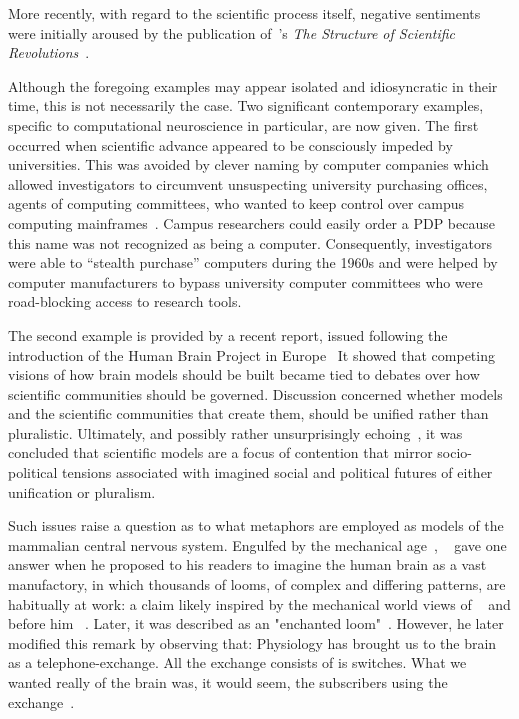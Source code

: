 \documentclass[11pt,3p,twocolumn]{JMN}
\begin{document}
More recently, with regard to the scientific process itself, negative sentiments were initially aroused by the publication of~\citeauthor{kuhn96}'s {\it The Structure of Scientific Revolutions}~\citep[first published 1962, see][]{bird22}.

Although the foregoing examples may appear isolated and idiosyncratic in their time, this is not necessarily the case. Two significant contemporary examples, specific to  computational neuroscience in particular, are now given. The first occurred when scientific advance appeared to be consciously impeded by universities. This was avoided by clever naming by computer companies which allowed investigators to circumvent unsuspecting university purchasing offices, agents of computing committees, who wanted to keep control over campus computing mainframes~\citep{Moore:2010vn}. Campus researchers could easily order a PDP because this name was not recognized as being a computer. Consequently, investigators were able to “stealth purchase” computers during the 1960s and were helped by computer manufacturers to bypass university computer committees who were road-blocking access to research tools.

The second example is provided by a recent report, issued following the introduction of the Human Brain Project in Europe~\citep{mahfoud21} It showed that competing visions of how brain models should be built became tied to debates over how scientific communities should be governed. Discussion concerned whether models and the scientific communities that create them, should be unified rather than pluralistic. Ultimately, and possibly rather unsurprisingly echoing~\citet{sperry80}, it was concluded that scientific models are a focus of contention that mirror socio-political tensions associated with imagined social and political futures of either unification or pluralism.

Such issues raise a question as to what metaphors are employed as models of the mammalian central nervous system. Engulfed by the mechanical age~\citep{carlyle52}, ~\citet{meyers87} gave one answer when he proposed to his readers to imagine the human brain as a vast manufactory, in which thousands of looms, of complex and differing patterns, are habitually at work: a claim likely inspired by the mechanical world views of ~\citet{descartes62} and before him ~\citet[][republished 2003]{fernel67}. Later, it was described as an "enchanted loom"~\citep{sherrington53}. However, he later modified this remark by observing that: Physiology has brought us to the brain as a telephone-exchange. All the exchange consists of is switches. What we wanted really of the brain was, it would seem, the subscribers using the exchange~\citep{sherrington40}.
\end{document}
